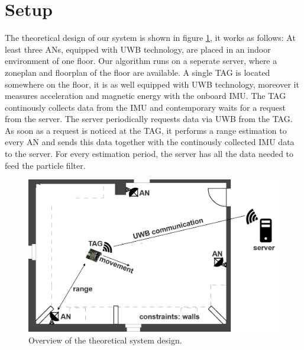 
\section{Setup}
The theoretical design of our system is shown in figure \ref{fig:system_design}, it works as follows:
At least three ANs, equipped with UWB technology, are placed in an indoor environment of one floor. Our algorithm runs on a seperate server, where a zoneplan and floorplan of the floor are available. A single TAG is located somewhere on the floor, it is as well equipped with UWB technology, moreover it measures acceleration and magnetic energy with the onboard IMU. The TAG continously collects data from the IMU and contemporary waits for a request from the server. The server periodically requests data via UWB from the TAG. As soon as a request is noticed at the TAG, it performs a range estimation to every AN and sends this data together with the continously collected IMU data to the server.
For every estimation period, the server has all the data needed to feed the particle filter.

\begin{figure}[th]
\centering
\includegraphics[width=1.0\textwidth]{Figures/system_design}
\decoRule
\caption[System Design]{Overview of the theoretical system design.}
\label{fig:system_design}
\end{figure}


